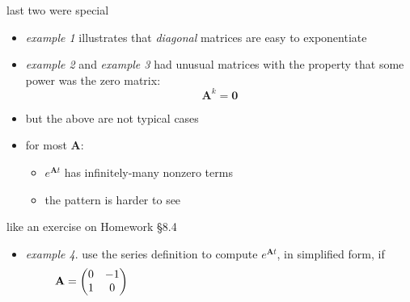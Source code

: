\documentclass[dvipsnames,colorlinks]{beamer}
\newcommand{\bA}{\mathbf{A}}
\begin{document}
\begin{frame}{last two were special}

\begin{itemize}
\item \emph{example 1} illustrates that \emph{diagonal} matrices are easy to exponentiate
\item \emph{example 2} and \emph{example 3} had unusual matrices with the property that some power was the zero matrix:
    $$\bA^k = \mathbf{0}$$
\item but the above are not typical cases
\item for most $\bA$:
    \begin{itemize}
    \item $e^{\bA t}$ has infinitely-many nonzero terms
    \item the pattern is harder to see
    \end{itemize}
\end{itemize}
\end{frame}


\begin{frame}{like an exercise on Homework \S8.4}

\begin{itemize}
\item \emph{example 4}.  use the series definition to compute $e^{\bA t}$, in simplified form, if
    $$\bA = \begin{pmatrix} 0 & -1 \\ 1 & 0 \end{pmatrix}     \hspace{80mm}$$
\end{itemize}

\vspace{40mm}
\end{frame}
\end{document}
